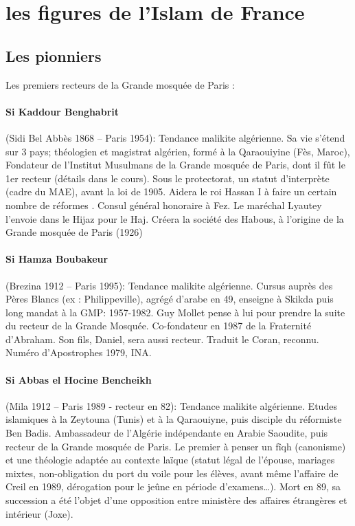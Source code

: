 \section{les figures de l'Islam de France}
\label{sec:figuresIslamFrance}
\mn{\CB}
\subsection{Les pionniers }

Les premiers recteurs de la Grande mosquée de Paris :
\paragraph{Si Kaddour Benghabrit} (Sidi Bel Abbès 1868 – Paris 1954): Tendance malikite algérienne. Sa vie s’étend sur 3 pays; théologien et magistrat algérien, formé à la Qaraouiyine (Fès, Maroc), Fondateur de l’Institut Musulmans de la Grande mosquée de Paris, dont il fût le 1er recteur (détails dans le cours). Sous le protectorat, un statut d'interprète (cadre du MAE), avant la loi de 1905. Aidera le roi Hassan I à faire un certain nombre de réformes . Consul général honoraire à Fez. Le maréchal Lyautey l'envoie dans le Hijaz pour le Haj. Créera la société des Habous, à l'origine de la Grande mosquée de Paris (1926)

\paragraph{Si Hamza Boubakeur} (Brezina 1912 – Paris 1995): Tendance malikite algérienne. Cursus auprès des Pères Blancs (ex : Philippeville), agrégé d’arabe en 49, enseigne à Skikda puis long mandat à la GMP: 1957-1982. Guy Mollet pense à lui pour prendre la suite du recteur de la Grande Mosquée. Co-fondateur en 1987 de la Fraternité d’Abraham. Son fils, Daniel, sera aussi recteur.  Traduit le Coran, reconnu.  Numéro d'Apostrophes 1979, INA. 

\paragraph{Si Abbas el Hocine Bencheikh} (Mila 1912 – Paris 1989 - recteur en 82): Tendance malikite algérienne. Etudes islamiques à la Zeytouna (Tunis) et à la Qaraouiyne, puis disciple du réformiste Ben Badis. Ambassadeur de l’Algérie indépendante en Arabie Saoudite, puis recteur de la Grande mosquée de Paris. Le premier à penser un fîqh (canonisme) et une théologie adaptée au contexte laïque (statut légal de l’épouse, mariages mixtes, non-obligation du port du voile pour les élèves, avant même l’affaire de Creil en 1989, dérogation pour le jeûne en période d’examens…). Mort en 89, sa succession a été l'objet d'une opposition entre ministère des affaires étrangères et intérieur (Joxe).

